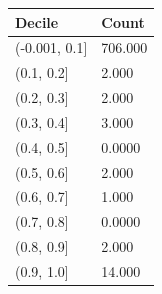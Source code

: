 \begin{tabular}{ll}
\toprule
Decile & Count \\
\midrule
(-0.001, 0.1] & 706.000 \\
(0.1, 0.2] & 2.000 \\
(0.2, 0.3] & 2.000 \\
(0.3, 0.4] & 3.000 \\
(0.4, 0.5] & 0.0000 \\
(0.5, 0.6] & 2.000 \\
(0.6, 0.7] & 1.000 \\
(0.7, 0.8] & 0.0000 \\
(0.8, 0.9] & 2.000 \\
(0.9, 1.0] & 14.000 \\
\bottomrule
\end{tabular}